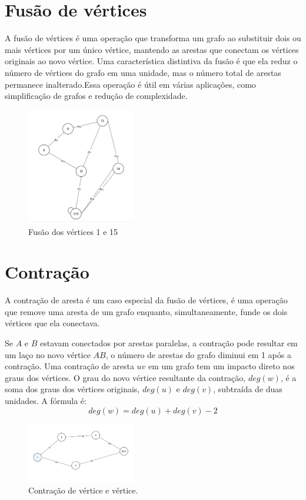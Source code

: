 \section{Fusão de vértices}\label{sec:fusao}
A fusão de vértices é uma operação que transforma um grafo ao substituir dois ou mais vértices por um único vértice, mantendo as arestas que conectam os vértices originais ao novo vértice. Uma característica distintiva da fusão é que ela reduz o número de vértices do grafo em uma unidade, mas o número total de arestas permanece inalterado.Essa operação é útil em várias aplicações, como simplificação de grafos e redução de complexidade.

\begin{figure}[!h]
	\centering
	\includegraphics[width=0.425\textwidth]{figuras/fusao_novo_novo.png}
	\caption{Fusão dos vértices 1 e 15}
	\label{fig:fusao}
\end{figure}

\section{Contração}\label{sec:contracao}
A contração de aresta é um caso especial da fusão de vértices, é uma operação que remove uma aresta de um grafo enquanto, simultaneamente, funde os dois vértices que ela conectava.

Se $A$ e $B$ estavam conectados por arestas paralelas, a contração pode resultar em um laço no novo vértice $AB$, o número de arestas do grafo diminui em 1 após a contração.
Uma contração de aresta $uv$ em um grafo tem um impacto direto nos graus dos vértices. O grau do novo vértice resultante da contração, $deg(w)$, é a soma dos graus dos vértices originais, $deg(u)$ e $deg(v)$, subtraída de duas unidades. A fórmula é:
\[
	deg(w) = deg(u) + deg(v) - 2
\]

\begin{figure}[!h]
	\centering
	\includegraphics[width=0.425\textwidth]{figuras/contracao_novo_novo.png}
	\caption{Contração de vértice e vértice.}
	\label{fig:fusao}
\end{figure}

